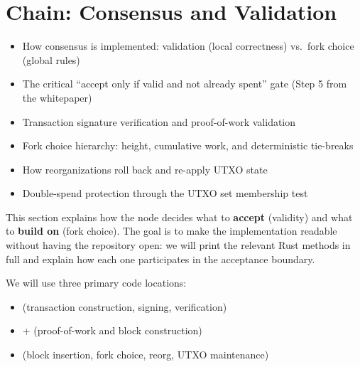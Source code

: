 \chapter{Chain: Consensus and Validation}
\label{ch:consensus}

\begin{learnbox}
\begin{itemize}
  \item How consensus is implemented: validation (local correctness) vs.\ fork choice (global rules)
  \item The critical ``accept only if valid and not already spent'' gate (Step 5 from the whitepaper)
  \item Transaction signature verification and proof-of-work validation
  \item Fork choice hierarchy: height, cumulative work, and deterministic tie-breaks
  \item How reorganizations roll back and re-apply UTXO state
  \item Double-spend protection through the UTXO set membership test
\end{itemize}
\end{learnbox}

This section explains how the node decides what to \textbf{accept} (validity) and what to \textbf{build on} (fork choice). The goal is to make the implementation readable without having the repository open: we will print the relevant Rust methods in full and explain how each one participates in the acceptance boundary.

We will use three primary code locations:

\begin{itemize}
  \item {} (transaction construction, signing, verification)
  \item {} +  (proof-of-work and block construction)
  \item {} (block insertion, fork choice, reorg, UTXO maintenance)
\end{itemize}

